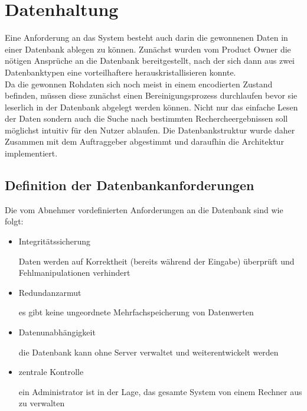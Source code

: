 \documentclass[a4paper,oneside,12pt]{report}
\begin{document}
		\section{Datenhaltung}
			Eine Anforderung an das System besteht auch darin die gewonnenen Daten in einer Datenbank ablegen zu können. Zunächst wurden vom Product Owner die nötigen Ansprüche an die Datenbank bereitgestellt, nach der sich dann aus zwei Datenbanktypen eine vorteilhaftere herauskristallisieren konnte. 
			\\
			Da die gewonnen Rohdaten sich noch meist in einem encodierten Zustand befinden, müssen diese zunächst einen Bereinigungsprozess durchlaufen bevor sie leserlich in der Datenbank abgelegt werden können. Nicht nur das einfache Lesen der Daten sondern auch die Suche nach bestimmten Rechercheergebnissen soll möglichst intuitiv für den Nutzer ablaufen. Die Datenbankstruktur wurde daher Zusammen mit dem Auftraggeber abgestimmt und daraufhin die Architektur implementiert.
		
			\subsection{Definition der Datenbankanforderungen}
			
				Die vom Abnehmer vordefinierten Anforderungen an die Datenbank sind wie folgt:
				
				\begin{itemize}
					\item Integritätssicherung\\
					\begin{small}
						Daten werden auf Korrektheit (bereits während der Eingabe) überprüft und Fehlmanipulationen  verhindert 
					\end{small}
					
					\item Redundanzarmut\\
					\begin{small}
						es gibt keine ungeordnete Mehrfachspeicherung von Datenwerten
					\end{small}
								
					\item Datenunabhängigkeit\\
					\begin{small}
						die Datenbank kann ohne Server verwaltet und weiterentwickelt werden
					\end{small} 
					
					\item zentrale Kontrolle\\
					\begin{small}
						ein Administrator ist in der Lage, das gesamte System von einem Rechner aus zu verwalten
					\end{small}
				\end{itemize}
				
\end{document}
